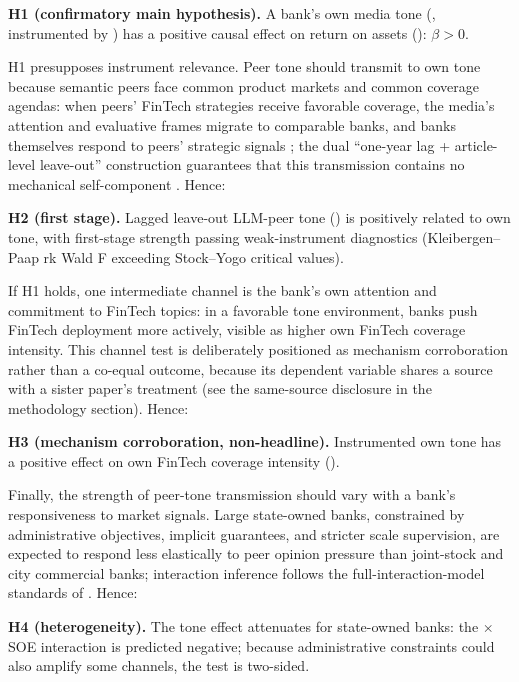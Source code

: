 \textbf{H1 (confirmatory main hypothesis).} A bank's own media tone
(, instrumented by ) has a
positive causal effect on return on assets (): $\beta > 0$.

H1 presupposes instrument relevance. Peer tone should transmit to own tone because semantic
peers face common product markets and common coverage agendas: when peers' FinTech strategies
receive favorable coverage, the media's attention and evaluative frames migrate to comparable
banks, and banks themselves respond to peers' strategic signals \parencite{leary2014peerfirms};
the dual ``one-year lag + article-level leave-out'' construction guarantees that this
transmission contains no mechanical self-component \parencite{manski1993reflection}. Hence:

\textbf{H2 (first stage).} Lagged leave-out LLM-peer tone () is
positively related to own tone, with first-stage strength passing weak-instrument diagnostics
(Kleibergen--Paap rk Wald F exceeding Stock--Yogo critical values).

If H1 holds, one intermediate channel is the bank's own attention and commitment to FinTech
topics: in a favorable tone environment, banks push FinTech deployment more actively, visible
as higher own FinTech coverage intensity. This channel test is deliberately positioned as
mechanism corroboration rather than a co-equal outcome, because its dependent variable shares
a source with a sister paper's treatment (see the same-source disclosure in the methodology
section). Hence:

\textbf{H3 (mechanism corroboration, non-headline).} Instrumented own tone has a positive
effect on own FinTech coverage intensity ().

Finally, the strength of peer-tone transmission should vary with a bank's responsiveness to
market signals. Large state-owned banks, constrained by administrative objectives, implicit
guarantees, and stricter scale supervision, are expected to respond less elastically to peer
opinion pressure than joint-stock and city commercial banks; interaction inference follows the
full-interaction-model standards of \textcite{brambor2006understanding}. Hence:

\textbf{H4 (heterogeneity).} The tone effect attenuates for state-owned banks: the
 $\times$ SOE interaction is predicted negative; because
administrative constraints could also amplify some channels, the test is two-sided.

